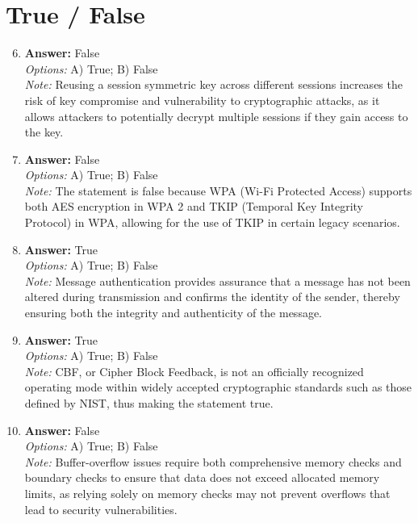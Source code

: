 \documentclass[12pt]{article}
\begin{document}
\section*{True / False}
\begin{enumerate}[label=\arabic*.]
\setcounter{enumi}{5}
\item \textbf{Answer:} False
\\ \textit{Options:} A) True; B) False
\\ \textit{Note:} Reusing a session symmetric key across different sessions increases the risk of key compromise and vulnerability to cryptographic attacks, as it allows attackers to potentially decrypt multiple sessions if they gain access to the key.
\item \textbf{Answer:} False
\\ \textit{Options:} A) True; B) False
\\ \textit{Note:} The statement is false because WPA (Wi-Fi Protected Access) supports both AES encryption in WPA 2 and TKIP (Temporal Key Integrity Protocol) in WPA, allowing for the use of TKIP in certain legacy scenarios.
\item \textbf{Answer:} True
\\ \textit{Options:} A) True; B) False
\\ \textit{Note:} Message authentication provides assurance that a message has not been altered during transmission and confirms the identity of the sender, thereby ensuring both the integrity and authenticity of the message.
\item \textbf{Answer:} True
\\ \textit{Options:} A) True; B) False
\\ \textit{Note:} CBF, or Cipher Block Feedback, is not an officially recognized operating mode within widely accepted cryptographic standards such as those defined by NIST, thus making the statement true.
\item \textbf{Answer:} False
\\ \textit{Options:} A) True; B) False
\\ \textit{Note:} Buffer-overflow issues require both comprehensive memory checks and boundary checks to ensure that data does not exceed allocated memory limits, as relying solely on memory checks may not prevent overflows that lead to security vulnerabilities.
\end{enumerate}
\end{document}
